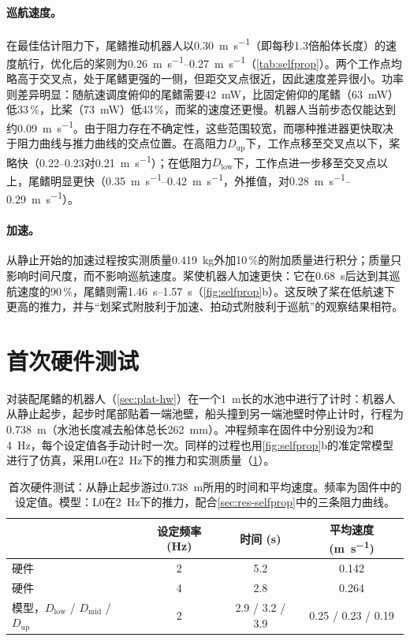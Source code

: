 \paragraph{巡航速度。}在最佳估计阻力下，尾鳍推动机器人以\SI{0.30}{\metre\per\second}（即每秒1.3倍船体长度）的速度航行，优化后的桨则为\SIrange{0.26}{0.27}{\metre\per\second}（\cref{tab:selfprop}）。两个工作点均略高于交叉点，处于尾鳍更强的一侧，但距交叉点很近，因此速度差异很小。功率则差异明显：随航速调度俯仰的尾鳍需要\SI{42}{\milli\watt}，比固定俯仰的尾鳍（\SI{63}{\milli\watt}）低33\,\%，比桨（\SI{73}{\milli\watt}）低43\,\%，而桨的速度还更慢。机器人当前步态仅能达到约\SI{0.09}{\metre\per\second}。由于阻力存在不确定性，这些范围较宽，而哪种推进器更快取决于阻力曲线与推力曲线的交点位置。在高阻力$D_\text{up}$下，工作点移至交叉点以下，桨略快（\SIrange{0.22}{0.23}{}对\SI{0.21}{\metre\per\second}）；在低阻力$D_\text{low}$下，工作点进一步移至交叉点以上，尾鳍明显更快（\SIrange{0.35}{0.42}{\metre\per\second}，外推值，对\SIrange{0.28}{0.29}{\metre\per\second}）。

\paragraph{加速。}从静止开始的加速过程按实测质量\SI{0.419}{\kilo\gram}外加10\,\%的附加质量进行积分；质量只影响时间尺度，而不影响巡航速度。桨使机器人加速更快：它在\SI{0.68}{\second}后达到其巡航速度的90\,\%，尾鳍则需\SIrange{1.46}{1.57}{\second}（\cref{fig:selfprop}b）。这反映了桨在低航速下更高的推力，并与“划桨式附肢利于加速、拍动式附肢利于巡航”的观察结果相符\cite{Walker2000}。

\section{首次硬件测试}
\label{sec:res-hw}

对装配尾鳍的机器人（\cref{sec:plat-hw}）在一个\SI{1}{\metre}长的水池中进行了计时：机器人从静止起步，起步时尾部贴着一端池壁，船头撞到另一端池壁时停止计时，行程为\SI{0.738}{\metre}（水池长度减去船体总长\SI{262}{\milli\metre}）。冲程频率在固件中分别设为\SI{2}{}和\SI{4}{\hertz}，每个设定值各手动计时一次。同样的过程也用\cref{fig:selfprop}b的准定常模型进行了仿真，采用L0在\SI{2}{\hertz}下的推力和实测质量（\cref{tab:hw}）。

\begin{table}[htb]
  \centering
  \caption[首次硬件测试]{首次硬件测试：从静止起步游过\SI{0.738}{\metre}所用的时间和平均速度。频率为固件中的设定值。模型：L0在\SI{2}{\hertz}下的推力，配合\cref{sec:res-selfprop}中的三条阻力曲线。}
  \label{tab:hw}
  \small
  \begin{tabular}{@{}lccc@{}}
    \toprule
    & 设定频率 (Hz) & 时间 (s) & 平均速度 (\si{\metre\per\second}) \\
    \midrule
    硬件 & 2 & 5.2 & 0.142 \\
    硬件 & 4 & 2.8 & 0.264 \\
    模型，$D_\text{low}$ / $D_\text{mid}$ / $D_\text{up}$ & 2 & 2.9 / 3.2 / 3.9 & 0.25 / 0.23 / 0.19 \\
    \bottomrule
  \end{tabular}
\end{table}

